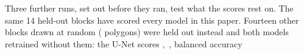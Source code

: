Three further runs, set out before they ran, test what the scores rest on. %
The same 14 held-out blocks have scored every model in this paper. Fourteen other blocks drawn at random
( polygons) were held out instead and both models retrained without them: the U-Net
scores , \kap\,, balanced accuracy
